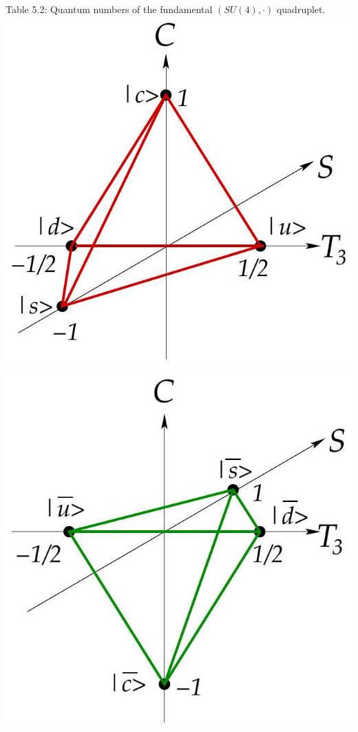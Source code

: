 \documentclass[10pt, letterpaper]{article}
\begin{document}
Table 5.2: Quantum numbers of the fundamental $(S U(4), \cdot)$ quadruplet.\\
\includegraphics[scale=0.3, center]{2025_05_20_8618f55a41bfe980b4b2g-78}\\
\includegraphics[scale=0.3, center]{2025_05_20_8618f55a41bfe980b4b2g-78(1)}
\end{document}
